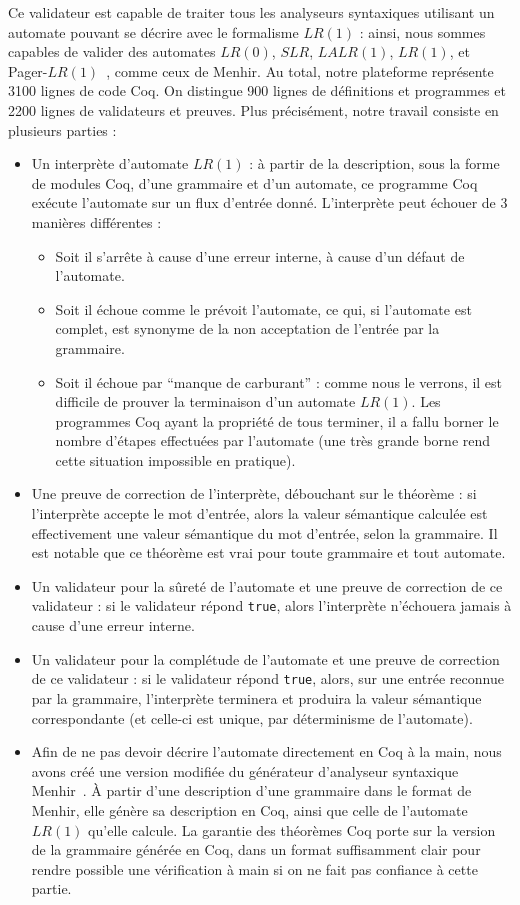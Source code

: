 \documentclass[a4paper,11pt]{article}
\begin{document}
Ce validateur est capable de traiter tous les analyseurs syntaxiques
utilisant un automate pouvant se décrire avec le formalisme $LR(1)$ :
ainsi, nous sommes capables de  valider des automates $LR(0)$, $SLR$,
$LALR(1)$, $LR(1)$, et Pager-$LR(1)$~\cite{pager}, comme ceux de
Menhir. Au total, notre plateforme représente 3100 lignes de code
Coq. On distingue 900 lignes de définitions et programmes et 2200
lignes de validateurs et preuves. Plus précisément, notre travail
consiste en plusieurs parties :

\begin{itemize}
\item Un interprète d'automate $LR(1)$ : à partir de la description,
  sous la forme de modules Coq, d'une grammaire et d'un automate, ce
  programme Coq exécute l'automate sur un flux d'entrée
  donné. L'interprète peut échouer de 3 manières différentes :
  \begin{itemize}
  \item Soit il s'arrête à cause d'une erreur interne, à cause d'un
    défaut de l'automate.
  \item Soit il échoue comme le prévoit l'automate, ce qui, si
    l'automate est complet, est synonyme de la non acceptation de
    l'entrée par la grammaire.
  \item Soit il échoue par ``manque de carburant'' : comme nous le
    verrons, il est difficile de prouver la terminaison d'un automate
    $LR(1)$. Les programmes Coq ayant la propriété de tous terminer,
    il a fallu borner le nombre d'étapes effectuées par l'automate
    (une très grande borne rend cette situation impossible en
    pratique).
  \end{itemize}
\item Une preuve de correction de l'interprète, débouchant sur le
  théorème : si l'interprète accepte le mot d'entrée, alors la valeur
  sémantique calculée est effectivement une valeur sémantique du mot
  d'entrée, selon la grammaire. Il est notable que ce théorème est
  vrai pour toute grammaire et tout automate.
\item Un validateur pour la sûreté de l'automate et une preuve de
  correction de ce validateur : si le validateur répond \verb+true+,
  alors l'interprète n'échouera jamais à cause d'une erreur interne.
\item Un validateur pour la complétude de l'automate et une preuve de
  correction de ce validateur : si le validateur répond \verb+true+,
  alors, sur une entrée reconnue par la grammaire, l'interprète
  terminera et produira la valeur sémantique correspondante (et
  celle-ci est unique, par déterminisme de l'automate).
\item Afin de ne pas devoir décrire l'automate directement en Coq à la
  main, nous avons créé une version modifiée du générateur d'analyseur
  syntaxique Menhir~\cite{menhir}. \`A partir d'une description d'une
  grammaire dans le format de Menhir, elle génère sa description en
  Coq, ainsi que celle de l'automate $LR(1)$ qu'elle calcule. La
  garantie des théorèmes Coq porte sur la version de la grammaire
  générée en Coq, dans un format suffisamment clair pour rendre
  possible une vérification à main si on ne fait pas confiance à cette
  partie.
\end{itemize}
\end{document}
